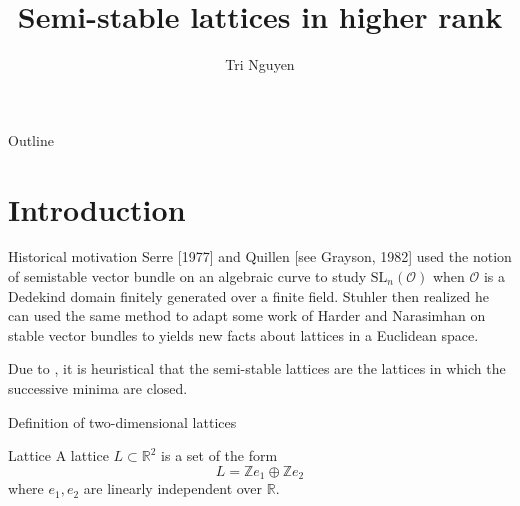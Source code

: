 \documentclass[pdf]{beamer}
\title{Semi-stable lattices in higher rank}
\author{Tri Nguyen}
\begin{document}
\begin{frame}
    \titlepage
\end{frame}

\begin{frame}{Outline}
    \tableofcontents
\end{frame}

\section{Introduction}
\begin{frame}{Historical motivation}
    Serre [1977] and Quillen [see Grayson, 1982] used the notion of semistable vector
    bundle on an algebraic curve to study $\text{SL}_n(\mathcal{O})$ when $\mathcal{O}$ is a Dedekind domain finitely generated over a finite field. Stuhler
    then realized he can used the same method to adapt some work of Harder and Narasimhan on stable vector bundles to yields new facts
    about lattices in a Euclidean space.
\end{frame}
\begin{frame}
    Due to \cite{} , it is heuristical that the semi-stable lattices are the lattices in which the successive minima are closed.
\end{frame}
\begin{frame}{Definition of two-dimensional lattices}
    \begin{block}{Lattice}
        A lattice $L \subset \mathbb{R}^2$ is a set of the form
        \[L = \mathbb{Z}e_1\oplus\mathbb{Z}e_2\]
        where $e_1,e_2$ are linearly independent over $\mathbb{R}$.
    \end{block}
\end{frame}
\end{document}
